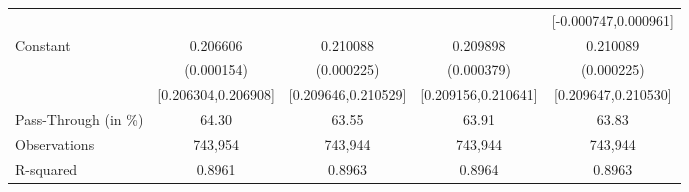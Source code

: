 {\begin{tabular}{l*{4}{c}}
                    &                     &                     &                     &[-0.000747,0.000961]         \\
Constant            &    0.206606\sym{***}&    0.210088\sym{***}&    0.209898\sym{***}&    0.210089\sym{***}\\
                    &  (0.000154)         &  (0.000225)         &  (0.000379)         &  (0.000225)         \\
                    &[0.206304,0.206908]         &[0.209646,0.210529]         &[0.209156,0.210641]         &[0.209647,0.210530]         \\
\midrule
Pass-Through (in \%)&       64.30         &       63.55         &       63.91         &       63.83         \\
Observations        &     743,954         &     743,944         &     743,944         &     743,944         \\
R-squared           &      0.8961         &      0.8963         &      0.8964         &      0.8963         \\
\bottomrule
\end{tabular}
}
